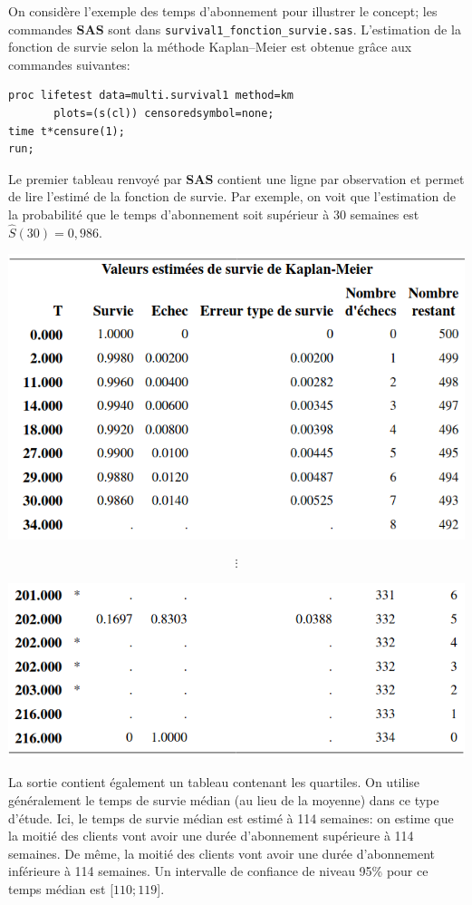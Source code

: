 \documentclass[
  11pt,
  letterpaper,
]{book}
\theoremstyle{definition}
\theoremstyle{definition}
\theoremstyle{definition}
\theoremstyle{remark}
\begin{document}
On considère l'exemple des temps d'abonnement pour illustrer le concept; les commandes \textbf{SAS} sont dans \texttt{survival1\_fonction\_survie.sas}. L'estimation de la fonction de survie selon la méthode Kaplan--Meier est obtenue grâce aux commandes suivantes:

\begin{verbatim}
proc lifetest data=multi.survival1 method=km
       plots=(s(cl)) censoredsymbol=none;
time t*censure(1);
run;
\end{verbatim}

Le premier tableau renvoyé par \textbf{SAS} contient une ligne par observation et permet de lire l'estimé de la fonction de survie. Par exemple, on voit que l'estimation de la probabilité que le temps d'abonnement soit supérieur à 30 semaines est \(\widehat{S}(30) = 0,986\).

\begin{center}\includegraphics[width=0.7\linewidth]{figures/05-survie-e1} \end{center}

\begin{align*} \vdots \end{align*}

\begin{center}\includegraphics[width=0.7\linewidth]{figures/05-survie-e2} \end{center}

La sortie contient également un tableau contenant les quartiles. On utilise généralement le temps de survie médian (au lieu de la moyenne) dans ce type d'étude. Ici, le temps de survie médian est estimé à 114 semaines: on estime que la moitié des clients vont avoir une durée d'abonnement supérieure à 114 semaines. De même, la moitié des clients vont avoir une durée d'abonnement inférieure à 114 semaines. Un intervalle de confiance de niveau 95\% pour ce temps médian est {[}\(110; 119\){]}.
\end{document}
